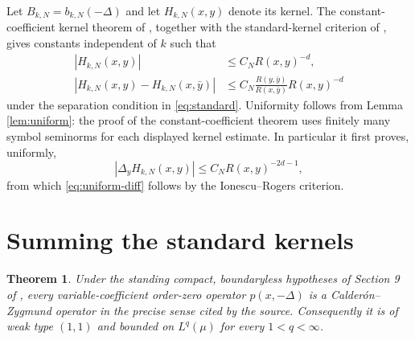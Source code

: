 \documentclass[11pt]{article}
\newtheorem{theorem}{Theorem}
\newcommand{\Rmet}{R}
\begin{document}
Let $B_{k,N}=b_{k,N}(-\Delta)$ and let $H_{k,N}(x,y)$ denote its kernel.
The constant-coefficient kernel theorem of \cite[Theorem 3.6]{IRS}, together
with the standard-kernel criterion of \cite{IR}, gives constants independent
of $k$ such that
\begin{align}
 |H_{k,N}(x,y)|&\le C_N\Rmet(x,y)^{-d},\label{eq:uniform-size}\\
 |H_{k,N}(x,y)-H_{k,N}(x,\bar y)|
 &\le C_N\frac{\Rmet(y,\bar y)}{\Rmet(x,\bar y)}
 \Rmet(x,y)^{-d}\label{eq:uniform-diff}
\end{align}
under the separation condition in \eqref{eq:standard}. Uniformity follows
from Lemma \ref{lem:uniform}: the proof of the constant-coefficient theorem
uses finitely many symbol seminorms for each displayed kernel estimate. In
particular it first proves, uniformly,
\[
 |\Delta_y H_{k,N}(x,y)|\le C_N\Rmet(x,y)^{-2d-1},
\]
from which \eqref{eq:uniform-diff} follows by the Ionescu--Rogers criterion.

\section{Summing the standard kernels}
\begin{theorem}\label{thm:main}
Under the standing compact, boundaryless hypotheses of Section 9 of
\cite{IRS}, every variable-coefficient order-zero operator $p(x,-\Delta)$ is a
Calder\'on--Zygmund operator in the precise sense cited by the source.
Consequently it is of weak type $(1,1)$ and bounded on $L^q(\mu)$ for every
$1<q<\infty$.
\end{theorem}
\end{document}
